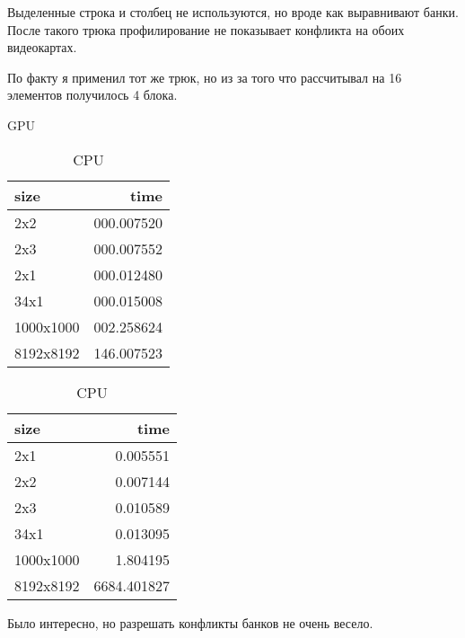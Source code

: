 \documentclass[12pt]{article}
\begin{document}
Выделенные строка и столбец не используются, но вроде как выравнивают банки.
После такого трюка профилирование не показывает конфликта на обоих видеокартах.

По факту я применил тот же трюк, но из за того что рассчитывал на 16 элементов получилось 4 блока.

{
}

\newpage


\begin{table}[!htb]
\begin{minipage}{.49\linewidth}
\centering
\caption*{GPU}
\begin{tabular}{|l|r|}
	\hline
	size      & time       \\
	\hline

	2x2       & 000.007520 \\
	2x3       & 000.007552 \\
	2x1       & 000.012480 \\
	34x1      & 000.015008 \\
	1000x1000 & 002.258624 \\
	8192x8192 & 146.007523 \\
	\hline
\end{tabular}
\end {minipage} %
\begin{minipage}{.49\linewidth}
\centering
\caption*{CPU}
\begin{tabular}{|l|r|}
	\hline
	size      & time        \\
	\hline

	2x1       & 0.005551    \\
	2x2       & 0.007144    \\
	2x3       & 0.010589    \\
	34x1      & 0.013095    \\
	1000x1000 & 1.804195    \\
	8192x8192 & 6684.401827 \\
	\hline
\end{tabular}
\end {minipage}
\end{table}




Было интересно, но разрешать конфликты банков не очень весело.
\end{document}
